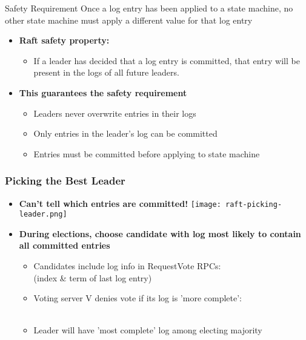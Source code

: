 \begin{frame}
    \begin{block}{Safety Requirement}
        Once a log entry has been applied to a state machine, no other state machine must apply a different value for that log entry
    \end{block}
    \begin{itemize}
        \item \textbf{Raft safety property:}
            \begin{itemize}
                \item If a leader has decided that a log entry is committed, that entry will be present in the logs of all future leaders.
            \end{itemize}
        \item \textbf{This guarantees the safety requirement}
            \begin{itemize}
                \item Leaders never overwrite entries in their logs
                \item Only entries in the leader's log can be committed
                \item Entries must be committed before applying to state machine
            \end{itemize}
    \end{itemize}
\end{frame}

\begin{frame}
    \frametitle{Picking the Best Leader}
    \begin{itemize}
        \item \textbf{Can't tell which entries are committed!}
        \texttt{[image: raft-picking-leader.png]}
        \item \textbf{During elections, choose candidate with log most likely to contain all committed entries}
            \begin{itemize}
                \item Candidates include log info in RequestVote RPCs: \\
                    (index \& term of last log entry)
                \item Voting server V denies vote if its log is 'more complete': \\
                    {\color{blue}{$(lastTerm_V > lastTerm_C) \|$}}  \\
                    {\color{blue}{$(lastTerm_V == lastTerm_C) \&\& (lastIndex_V > lastIndex_C)$}}
                \item Leader will have 'most complete' log among electing majority
            \end{itemize}
    \end{itemize}
\end{frame}

